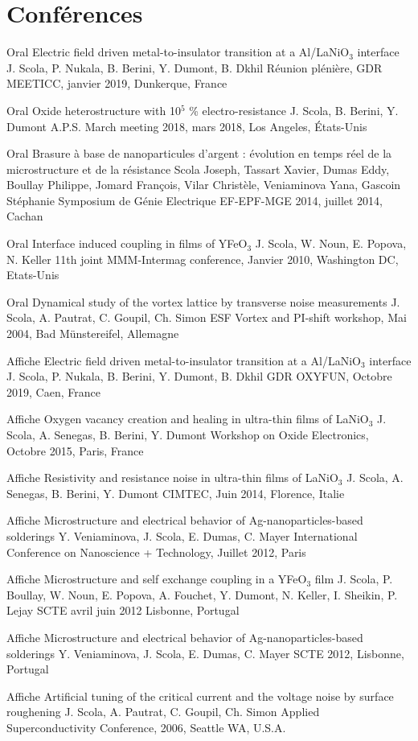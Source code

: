 \section{Conférences}
\cventry
	{}
	{Oral}
	{Electric field driven metal-to-insulator transition at a Al/LaNiO$_3$ interface}
	{J. Scola, P. Nukala, B. Berini, Y. Dumont, B. Dkhil}
	{}
	{Réunion plénière, GDR MEETICC, janvier 2019, Dunkerque, France}
	
\cventry
	{}
	{Oral}
	{Oxide heterostructure with 10$^5$ \% electro-resistance}
	{J. Scola, B. Berini, Y. Dumont}
	{}
	{A.P.S. March meeting 2018, mars 2018, Los Angeles, États-Unis}
	
\cventry
	{}
	{Oral}
	{Brasure à base de nanoparticules d'argent : évolution en temps réel de la microstructure et
de la résistance}
	{Scola Joseph, Tassart Xavier, Dumas Eddy, Boullay Philippe, Jomard François, Vilar Christèle,
Veniaminova Yana, Gascoin Stéphanie}
	{}
	{Symposium de Génie Electrique EF-EPF-MGE 2014, juillet 2014, Cachan}

\cventry
	{}
	{Oral}
	{Interface induced coupling in films of YFeO$_3$}
	{J. Scola, W. Noun, E. Popova, N. Keller}
	{}
	{11th joint MMM-Intermag conference, Janvier 2010, Washington DC, Etats-Unis}

\cventry
	{}
	{Oral}
	{Dynamical study of the vortex lattice by transverse noise measurements}
	{J. Scola, A. Pautrat, C. Goupil, Ch. Simon}
	{}
	{ESF Vortex and PI-shift workshop, Mai 2004, Bad Münstereifel, Allemagne}

\cventry
	{}
	{Affiche}
	{Electric field driven metal-to-insulator transition at a Al/LaNiO$_3$ interface}
	{J. Scola, P. Nukala, B. Berini, Y. Dumont, B. Dkhil}
	{}
	{GDR OXYFUN, Octobre 2019, Caen, France}
	
\cventry
	{}
	{Affiche}
	{Oxygen vacancy creation and healing in ultra-thin films of LaNiO$_3$}
	{J. Scola, A. Senegas, B. Berini, Y. Dumont}
	{}
	{Workshop on Oxide Electronics, Octobre 2015, Paris, France}

\cventry
	{}
	{Affiche}
	{Resistivity and resistance noise in ultra-thin films of LaNiO$_3$}
	{J. Scola, A. Senegas, B. Berini, Y. Dumont}
	{}
	{CIMTEC, Juin 2014, Florence, Italie}
  
\cventry
	{}
	{Affiche}
	{Microstructure and electrical behavior of Ag-nanoparticles-based solderings}
	{Y. Veniaminova, J. Scola, E. Dumas, C. Mayer}
	{}
	{International Conference on Nanoscience + Technology, Juillet 2012, Paris}  
 
\cventry
	{}
	{Affiche}
	{Microstructure and self exchange coupling in a YFeO$_3$ film}
	{J. Scola, P. Boullay, W. Noun, E. Popova, A. Fouchet, Y. Dumont, N. Keller, I. Sheikin, P. Lejay}
	{}
	{SCTE avril juin 2012 Lisbonne, Portugal} 

\cventry
	{}
	{Affiche}
	{Microstructure and electrical behavior of Ag-nanoparticles-based solderings}
	{Y. Veniaminova, J. Scola, E. Dumas, C. Mayer}
	{}
	{SCTE 2012, Lisbonne, Portugal} 

\cventry
	{}
	{Affiche}
	{Artificial tuning of the critical current and the voltage noise by surface roughening}
	{J. Scola, A. Pautrat, C. Goupil, Ch. Simon}
	{}
	{Applied Superconductivity Conference, 2006, Seattle WA, U.S.A.}